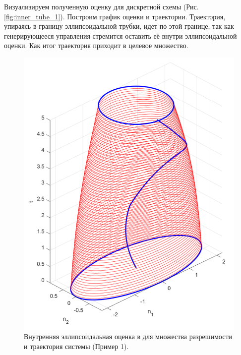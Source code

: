 Визуализируем полученную оценку для дискретной схемы (Рис. \eqref{fig:inner_tube_1}). 
Построим график оценки и траектории. Траектория, упираясь в границу эллипсоидальной трубки,
 идет по этой границе, так как генерирующееся управления стремится оставить её внутри
 эллипсоидальной оценки. Как итог траектория приходит в целевое множество.

\begin{figure}[ht]
	\centering
	\includegraphics[width = 0.6\linewidth]{"./resources/evolution_first_example_cropped.pdf"}
	\caption{Внутренняя эллипсоидальная оценка в для множества разрешимости и траектория системы (Пример 1).}
    \label{fig:inner_tube_1}
\end{figure}

